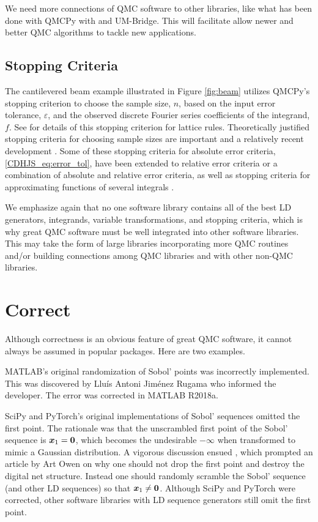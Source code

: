 \documentclass[graybox]{svmult}
\begin{document}
We need more connections of QMC software to other libraries, like what has been done with  QMCPy with and UM-Bridge.  This will facilitate allow newer and better QMC algorithms to tackle new applications.

\subsection{Stopping Criteria}
The cantilevered beam example illustrated in Figure \ref{fig:beam} utilizes QMCPy's stopping criterion to choose the sample size, $n$, based on the input error tolerance, $\varepsilon$, and the observed discrete Fourier series coefficients of the integrand, $f$.  See \cite{HicJim16a} for details of this stopping criterion for lattice rules.  Theoretically justified stopping criteria for choosing sample sizes are important and a relatively recent development \cite{HicEtal14a,HicJim16a,JimHic16a,RatHic19a,JagHic22a}.  Some of these stopping criteria for absolute error criteria, \eqref{CDHJS_eq:error_tol},  have been extended to relative error criteria or a combination of absolute and relative error criteria, as well as stopping criteria for approximating functions of several integrals \cite{Jia16a,GilJim16b,HicEtal17a,JagSor23a}.

We emphasize again that no one software library contains all of the best LD generators, integrands, variable transformations, and stopping criteria, which is why great QMC software must be well integrated into other software libraries.  This may take the form of large libraries incorporating more QMC routines and/or building connections among QMC libraries and with other non-QMC libraries.


\section{Correct} \label{CDHJS_sec:correct}
Although correctness is an obvious feature of great QMC software, it cannot always be assumed in popular packages.  Here are two examples.

MATLAB's original randomization of Sobol' points was incorrectly implemented.  This was discovered by Llu\'is Antoni Jim\'enez Rugama who informed the developer.  The error was corrected in MATLAB R2018a.  

SciPy and PyTorch's original implementations of Sobol' sequences omitted the first point.  The rationale was that the unscrambled first point of the Sobol' sequence is ${\boldsymbol{x}}_1 = {\boldsymbol{0}}$, which becomes the undesirable $\boldsymbol{-\infty}$ when transformed to mimic a Gaussian distribution.  A vigorous discussion ensued \cite{scipySobol2020a}, which prompted an article by Art Owen \cite{Owe22a} on why one should not drop the first point and destroy the digital net structure.  Instead one should randomly scramble the Sobol' sequence (and other LD sequences) so that ${\boldsymbol{x}}_1 \ne {\boldsymbol{0}}$.  Although SciPy and PyTorch were corrected, other software libraries with LD sequence generators still omit the first point.
\end{document}
